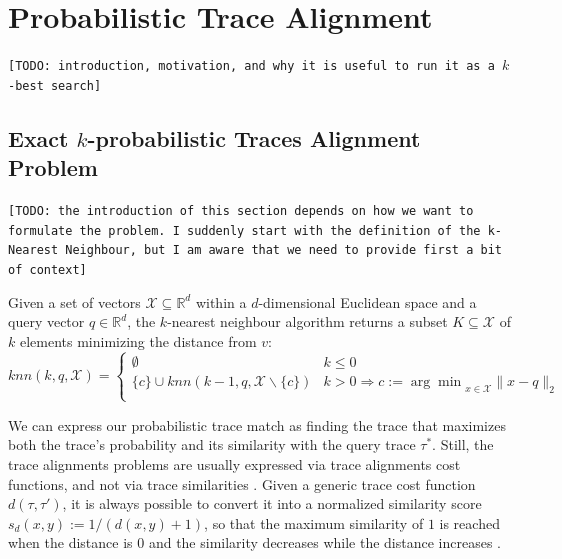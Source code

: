 \section{Probabilistic Trace Alignment}
\texttt{\color{red}[TODO: introduction, motivation, and why it is useful to run it as a $k$-best search]}

\subsection{Exact $k$-probabilistic Traces Alignment Problem}\label{subsec:exbkptap}
\texttt{\color{red}[TODO: the introduction of this section depends on how we want to formulate the problem. I suddenly start with the definition of the k-Nearest Neighbour, but I am aware that we need to provide first a bit of context]}

\begin{definition}
Given a set of vectors  $\mathcal{X}\subseteq \mathbb{R}^d$ within a $d$-dimensional Euclidean space and a query vector $q\in\mathbb{R}^d$, the $k$-nearest neighbour algorithm returns a subset $K\subseteq\mathcal{X}$ of $k$ elements minimizing the distance from $v$:
$$knn(k,q,\mathcal{X})=\begin{cases}
	\emptyset& k \leq 0\\
	\{c\}\cup knn(k-1,q,\mathcal{X}\backslash\{c\}) & k> 0 \Rightarrow c:={\arg\min}_{x\in\mathcal{X}}\|x-q\|_2\\
\end{cases}$$
\end{definition}

We can express our probabilistic trace match as finding the trace that maximizes both the trace's probability and its similarity with the query trace $\tau^*$. Still, the trace alignments problems are usually expressed via trace alignments cost functions, and not via trace similarities \cite{LeoniM17}. Given a generic trace cost function $d(\tau,\tau')$, it is always possible to convert it into a normalized similarity score $s_d(x,y):=1/(d(x,y)+1)$, so that the maximum similarity of $1$ is reached when the distance is $0$ and the similarity decreases while the distance increases \cite{BergamiBM20}.


